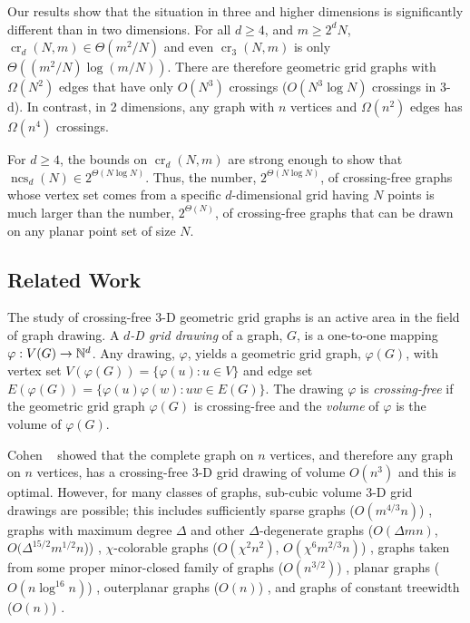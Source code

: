 \documentclass[12pt]{article}
\newcommand{\n}{N}
\DeclareMathOperator{\crs}{cr}
\DeclareMathOperator{\ncs}{ncs}
\begin{document}
Our results show that the situation in three and higher dimensions
is significantly different than in two dimensions. For all $d \ge
4$, and $m\ge 2^d\n$, $\crs_d(\n,m)\in \Theta(m^2/\n)$ and even
$\crs_3(\n,m)$ is only $\Theta((m^2/\n)\log(m/\n))$.
There are therefore geometric grid graphs with $\Omega(\n^2)$ edges
that have only $O(\n^3)$ crossings ($O(\n^3\log\n)$ crossings in
3-d).  In contrast, in 2 dimensions, any graph with $n$ vertices and
$\Omega(n^2)$ edges has $\Omega(n^4)$ crossings.

For $d\ge 4$, the bounds on $\crs_d(\n,m)$ are strong enough to
show that $\ncs_d(\n)\in 2^{\Theta(\n\log\n)}$.  Thus, the number,
$2^{\Theta(\n\log\n)}$, of crossing-free graphs whose vertex set comes
from a specific $d$-dimensional grid having $\n$ points is much larger
than the number, $2^{\Theta(\n)}$,  of crossing-free graphs that can be
drawn on any planar point set of size $\n$.

\subsection{Related Work}

The study of crossing-free 3-D geometric grid graphs is an
active area in the field of graph drawing.  A \emph{$d$-D
grid drawing} of a graph, $G$, is a
one-to-one mapping $\varphi:V(G)\rightarrow \mathbb{N}^d$.  Any drawing,
$\varphi$, yields a geometric grid graph, $\varphi(G)$, with
vertex set $V(\varphi(G))=\{\varphi(u):u\in V\}$ and edge set
$E(\varphi(G))=\{\varphi(u)\varphi(w):uw\in E(G)\}$.  The drawing
$\varphi$ is \emph{crossing-free} if the geometric grid graph $\varphi(G)$
is crossing-free and the \emph{volume} of $\varphi$ is the volume of
$\varphi(G)$.

Cohen \etal~\cite{cohen.eades.ea:three-dimensional} showed that the
complete graph on $n$ vertices, and therefore any graph on $n$
vertices, has a crossing-free 3-D grid drawing of volume $O(n^3)$ and this
is optimal.  However, for many classes of graphs, sub-cubic volume 3-D
grid drawings are possible; this includes 
sufficiently sparse graphs ($O(m^{4/3}n)$)
  \cite{dujmovic.wood:three-dimensional}, 
  graphs with maximum degree $\Delta$ and other $\Delta$-degenerate
  graphs 
  ($O(\Delta mn)$, $O(\Delta^{15/2}m^{1/2}n$)) 
  \cite{dujmovic.wood:three-dimensional,dujmovic.wood:upward},
$\chi$-colorable graphs 
  ($O(\chi^2n^2)$, $O(\chi^6m^{2/3}n)$)
  \cite{pach.thiele.ea:three-dimensional,dujmovic.wood:three-dimensional}, 
graphs taken from some proper minor-closed family of graphs 
  ($O(n^{3/2})$)
  \cite{dujmovic.wood:three-dimensional}, 
planar graphs ($O(n\log^{16} n)$)
  \cite{battista.frati.ea:on},
outerplanar graphs ($O(n)$)
  \cite{felsner.liotta.ea:straight-line},
and graphs of constant treewidth ($O(n)$) \cite{dujmovic.morin.ea:layout}.  
\end{document}
